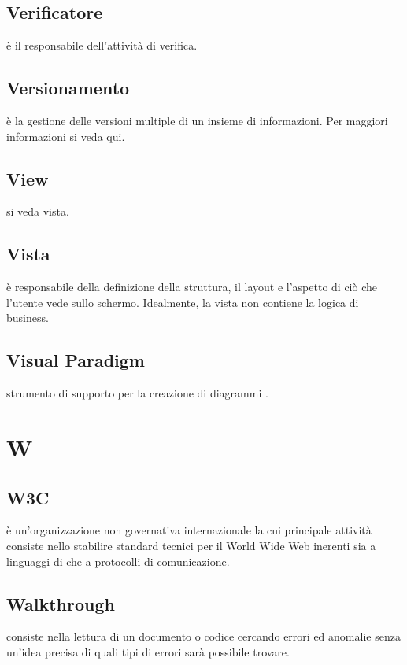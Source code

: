 \documentclass[12pt,a4paper]{article}
\begin{document}
\subsection{Verificatore} 
è il responsabile dell'attività di verifica.

\subsection{Versionamento} 
è la gestione delle versioni multiple di un insieme di informazioni. Per maggiori informazioni si veda \href{http://it. wikipedia.org/wiki/Controllo_versione}{qui}.

\subsection{View} 
si veda vista.

\subsection{Vista} 
è responsabile della definizione della struttura, il layout e l'aspetto di ciò che l'utente vede sullo schermo. Idealmente, la vista non contiene la logica di business.

\subsection{Visual Paradigm} 
strumento di supporto per la creazione di diagrammi .


\newpage

\section{W}

\subsection{W3C} 
è un'organizzazione non governativa internazionale la cui principale attività  consiste nello stabilire standard tecnici per il World Wide Web inerenti sia a linguaggi di  che a protocolli di comunicazione.

\subsection{Walkthrough} 
consiste nella lettura di un documento o codice cercando errori ed anomalie senza un'idea precisa di quali tipi di errori sarà possibile trovare.
\end{document}

